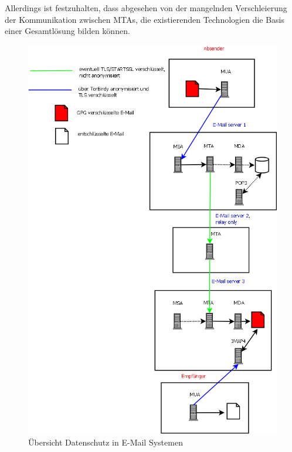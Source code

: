 Allerdings ist festzuhalten, dass abgesehen von der mangelnden Verschleierung der Kommunikation zwischen MTAs, die existierenden Technologien die Basis einer Gesamtlösung bilden können.

\begin{figure}[htb]
	\centering
	\includegraphics[scale=0.4]{Content/Problematik/BetrachtungDatenschutz/Bewertung.png}
	\caption{Übersicht Datenschutz in E-Mail Systemen}
	\label{fig:bewertung}
\end{figure}
\vfill
\clearpage

